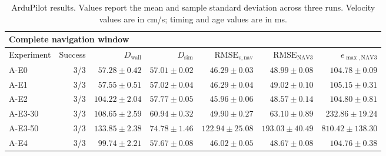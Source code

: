 \begin{table}[t]
    \centering
    \caption{ArduPilot results. Values report the mean and sample
    standard deviation across three runs. Velocity values are in
    cm/s; timing and age values are in ms.}
    \label{tab:ardupilot-results}
    \scriptsize
    \setlength{\tabcolsep}{3.5pt}

    \begin{tabular}{@{}lrrrrrr@{}}
        \toprule
        \multicolumn{7}{l}{
        \textbf{Complete navigation window}
        }\\
        \midrule
        Experiment &
        Success &
        \(D_{\mathrm{wall}}\) &
        \(D_{\mathrm{sim}}\) &
        \(\mathrm{RMSE}_{v,\mathrm{nav}}\) &
        \(\mathrm{RMSE}_{\mathrm{NAV3}}\) &
        \(e_{\max,\mathrm{NAV3}}\) \\
        \midrule

        A-E0 &
        3/3 &
        \(57.28 \pm 0.42\) &
        \(57.01 \pm 0.02\) &
        \(46.29 \pm 0.03\) &
        \(48.99 \pm 0.08\) &
        \(104.78 \pm 0.09\) \\

        A-E1 &
        3/3 &
        \(57.55 \pm 0.51\) &
        \(57.02 \pm 0.04\) &
        \(46.29 \pm 0.04\) &
        \(49.02 \pm 0.10\) &
        \(105.15 \pm 0.31\) \\

        A-E2 &
        3/3 &
        \(104.22 \pm 2.04\) &
        \(57.77 \pm 0.05\) &
        \(45.96 \pm 0.06\) &
        \(48.57 \pm 0.14\) &
        \(104.80 \pm 0.81\) \\

        A-E3-30 &
        3/3 &
        \(108.65 \pm 2.59\) &
        \(60.94 \pm 0.32\) &
        \(49.90 \pm 0.27\) &
        \(63.10 \pm 0.89\) &
        \(232.86 \pm 19.24\) \\

        A-E3-50 &
        3/3 &
        \(133.85 \pm 2.38\) &
        \(74.78 \pm 1.46\) &
        \(122.94 \pm 25.08\) &
        \(193.03 \pm 40.49\) &
        \(810.42 \pm 138.30\) \\

        A-E4 &
        3/3 &
        \(99.74 \pm 2.21\) &
        \(57.67 \pm 0.08\) &
        \(46.02 \pm 0.05\) &
        \(48.67 \pm 0.08\) &
        \(104.76 \pm 0.38\) \\

        \bottomrule
    \end{tabular}


\end{table}
